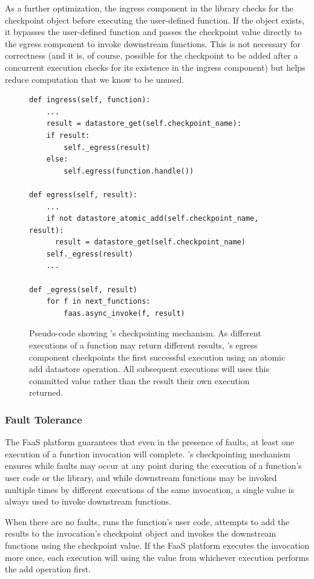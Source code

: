 As a further optimization, the ingress component in the \name{} library checks
for the checkpoint object before executing the user-defined function. If the
object exists, it bypasses the user-defined function and passes the checkpoint
value directly to the egress component to invoke downstream functions. This is
not necessary for correctness (and it is, of course, possible for the checkpoint
to be added after a concurrent execution checks for its existence in the ingress
component) but helps reduce computation that we know to be unused.

\begin{figure}
\begin{verbatim}
def ingress(self, function):
    ...
    result = datastore_get(self.checkpoint_name):
    if result:
        self._egress(result)
    else:
        self.egress(function.handle())

def egress(self, result):
    ...
    if not datastore_atomic_add(self.checkpoint_name, result):
      result = datastore_get(self.checkpoint_name)
    self._egress(result)
    ...

def _egress(self, result)
    for f in next_functions:
        faas.async_invoke(f, result)
\end{verbatim}
\label{fig:design:checkpoint}
\caption{Pseudo-code showing \name{}'s checkpointing mechanism. As different
executions of a function may return different results, \name{}'s egress
component checkpoints the first successful execution using an atomic add
datastore operation. All subsequent executions will uses this committed value
rather than the result their own execution returned.}
\end{figure}

\subsubsection{Fault Tolerance}

The FaaS platform guarantees that even in the presence of faults, at least one
execution of a function invocation will complete. \name{}'s checkpointing
mechanism ensures while faults may occur at any point during the execution of a
function's user code or the \name{} library, and while downstream functions may
be invoked multiple times by different executions of the same invocation, a
single value is always used to invoke downstream functions.

When there are no faults, \name{} runs the function's user code, attempts to add
the results to the invocation's checkpoint object and invokes the downstream
functions using the checkpoint value. If the FaaS platform executes the
invocation more once, each execution will using the value from whichever
execution performs the add operation first.


